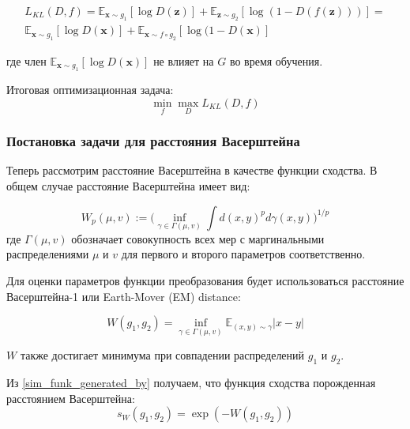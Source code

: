 \documentclass[12pt]{extarticle}
\newcommand{\bfx}{\mathbf{x}}
\newcommand{\bfz}{\mathbf{z}}
\newcommand{\expectation}{\mathbb{E}}
\begin{document}
\begin{multline*}
    L_{KL}(D, f) =  \expectation_{\bfx\sim g_1}[\log D(\bfz)] + \expectation_{\bfz\sim g_2} [\log(1 - D(f(\bfz)))] = \\  \expectation_{\bfx \sim g_1}[\log D(\bfx)] + \expectation_{\bfx\sim f\circ g_2}[\log(1 - D(\bfx)]
\end{multline*}

где член $\expectation_{\bfx\sim g_1}[\log D(\bfx)]$ не влияет на $G$ во время обучения.

Итоговая оптимизационная задача:
\begin{equation}
    \label{minmax_for_KL}
    \min_f\max_D L_{KL}(D,f)
\end{equation}


\newpage
\subsubsection{Постановка задачи для расстояния Васерштейна}

Теперь рассмотрим расстояние Васерштейна в качестве функции сходства. В общем случае расстояние Васерштейна имеет вид:

$$W_p(\mu, v) := \Big ( \inf_{\gamma \in \Gamma(\mu, v)} \int d(x, y)^p d\gamma(x, y) \Big)^{1/p}$$
где $\Gamma(\mu, v)$ обозначает совокупность всех мер с маргинальными распределениями $\mu$ и $v$ для первого и второго параметров соответственно.

Для оценки параметров функции преобразования будет использоваться расстояние Васерштейна-1 или Earth-Mover (EM) distance:

\begin{equation}
    \label{W1_intro}
    W(g_1, g_2) = \inf_{\gamma \in \Gamma(\mu, v)} \mathbb{E}_{(x, y) \sim \gamma} |x - y|
\end{equation}

$W$ также достигает минимума при совпадении распределений $g_1$ и $g_2$. 


Из \eqref{sim_funk_generated_by} получаем, что функция сходства порожденная расстоянием Васерштейна:
\begin{equation}
    \label{W_sim_function}
    s_{W} (g_1 , g_2) = \exp(-W(g_1 , g_2))
\end{equation}
\end{document}
